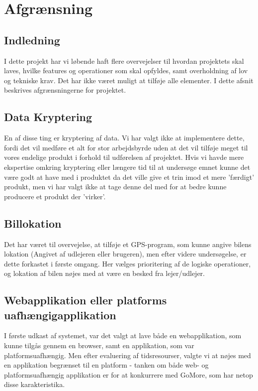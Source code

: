 \documentclass[Rapport/Rapport_main.tex]{subfiles}
\begin{document}
\section{Afgrænsning}
\subsection*{Indledning}
I dette projekt har vi løbende haft flere overvejelser til hvordan projektets skal laves, hvilke features og operationer som skal opfyldes, samt overholdning af lov og tekniske krav. Det har ikke været muligt at tilføje alle elementer. I dette afsnit beskrives afgrænsningerne for projektet.

\subsection{Data Kryptering}
En af disse ting er kryptering af data. Vi har valgt ikke at implementere dette, fordi det vil medføre et alt for stor arbejdsbyrde uden at det vil tilføje meget til vores endelige produkt i forhold til udførelsen af projektet. Hvis vi havde mere ekspertise omkring kryptering eller længere tid til at undersøge emnet kunne det være godt at have med i produktet da det ville give et trin imod et mere 'færdigt' produkt, men vi har valgt ikke at tage denne del med for at bedre kunne producere et produkt der 'virker'. 

\subsection{Billokation}
Det har været til overvejelse, at tilføje et GPS-program, som kunne angive bilens lokation (Angivet af udlejeren eller brugeren), men efter videre undersøgelse, er dette forkastet i første omgang. Her vælges prioritering af de logiske operationer, og lokation af bilen nøjes med at være en besked fra lejer/udlejer. 

\subsection{Webapplikation eller platforms uafhængigapplikation}
I første udkast af systemet, var det valgt at lave både en webapplikation, som kunne tilgås gennem en browser, samt en applikation, som var platformsuafhængig. Men efter evaluering af tidsresourser, valgte vi at nøjes med en applikation begrænset til en platform - tanken om både web- og platformsuafhængig applikation er for at konkurrere med GoMore, som har netop disse karakteristika.
\end{document}
